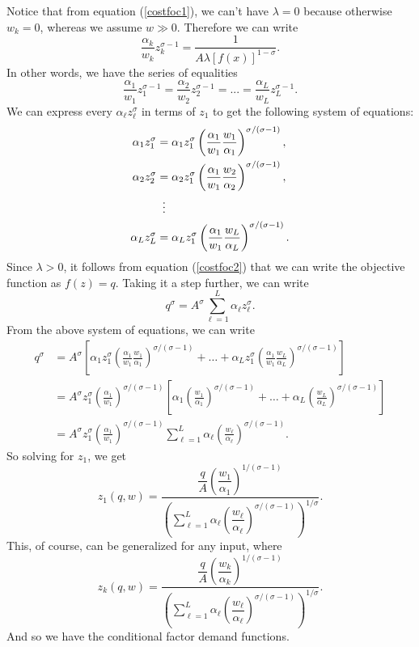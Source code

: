\documentclass[12pt]{article}
\theoremstyle{definition}
\begin{document}
Notice that from equation (\ref{costfoc1}), we can't have $\lambda=0$ because otherwise $w_k=0$, whereas we assume $w \gg 0$.  Therefore we can write
	\[	\frac{\alpha_k}{w_k}z_k^{\sigma - 1} = \frac{1}{A \lambda[ f(x)]^{1 - \sigma}}.\]
In other words, we have the series of equalities
	\[ \frac{\alpha_1}{w_1}z_1^{\sigma - 1} =\frac{\alpha_2}{w_2}z_2^{\sigma - 1} = ... = \frac{\alpha_L}{w_L}z_L^{\sigma - 1}.	\]
We can express every $\alpha_{\ell}z_{\ell}^{\sigma}$ in terms of $z_1$ to get the following system of equations:
\begin{align*}
		\alpha_{1}z_1^{\sigma} &= \alpha_1 z_1^{\sigma} \left (\frac{\alpha_1}{w_1} \frac{w_1}{\alpha_1} \right)^{\sigma / (\sigma - 1)},\\
	\alpha_{2}z_2^{\sigma} &= 	\alpha_{2} z_1^{\sigma}\left (\frac{\alpha_1}{w_1} \frac{w_2}{\alpha_2} \right)^{\sigma / (\sigma - 1)},\\
	&\mathrel{\makebox[\widthof{=}]{\vdots}} \\
	\alpha_{L}z_L^{\sigma} &= \alpha_Lz_1^{\sigma} \left (\frac{\alpha_1}{w_1} \frac{w_L}{\alpha_L} \right)^{\sigma / (\sigma - 1)}.
\end{align*}
Since $\lambda > 0$, it follows from equation (\ref{costfoc2}) that we can write the objective function as $f(z)=q$. Taking it a step further, we can write
	\[q^{\sigma} = A^{\sigma} \sum_{\ell = 1}^L \alpha_{\ell} z_{\ell}^{\sigma}. \]
From the above system of equations, we can write
\begin{align*}
	q^{\sigma} &= A^{\sigma} \left[ \alpha_1 z_1^{\sigma} \left (\frac{\alpha_1}{w_1} \frac{w_1}{\alpha_1} \right)^{\sigma / (\sigma - 1)}  + \hdots +  \alpha_L z_1^{\sigma} \left (\frac{\alpha_1}{w_1} \frac{w_L}{\alpha_L} \right)^{\sigma / (\sigma - 1)} \right] \\
		&= A^{\sigma}z_1^{\sigma}  \left(\frac{\alpha_1}{w_1}\right)^{\sigma / (\sigma - 1)} \left[ \alpha_1 \left (\frac{w_1}{\alpha_1} \right)^{\sigma / (\sigma - 1)}  + \hdots +  \alpha_L \left ( \frac{w_L}{\alpha_L} \right)^{\sigma / (\sigma - 1)} \right]	\\
		&= A^{\sigma}z_1^{\sigma}  \left(\frac{\alpha_1}{w_1}\right)^{\sigma / (\sigma - 1)} \sum_{\ell=1}^L \alpha_{\ell} \left( \frac{w_{\ell}}{\alpha_{\ell}} \right)^{\sigma / (\sigma - 1)}.
\end{align*}
So solving for $z_1$, we get
	\[ z_1(q,w)  =\frac{ \dfrac{q}{A} \left(\dfrac{w_1}{\alpha_1}\right)^{1 / (\sigma - 1)} }{\left( \sum_{\ell=1}^L \alpha_{\ell} \left( \dfrac{w_{\ell}}{\alpha_{\ell}} \right)^{\sigma / (\sigma - 1)} \right) ^{1 / \sigma}}.
	\]
This, of course, can be generalized for any input, where
	\[ z_k(q,w)  =\frac{\dfrac{q}{A} \left(\dfrac{w_k}{\alpha_k}\right)^{1 / (\sigma - 1)} }{\left( \sum_{\ell=1}^L \alpha_{\ell} \left( \dfrac{w_{\ell}}{\alpha_{\ell}} \right)^{\sigma / (\sigma - 1)} \right) ^{1 / \sigma}}.
	\]
And so we have the conditional factor demand functions. 
\end{document}
